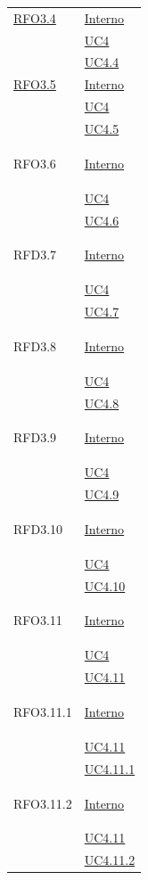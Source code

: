 \begin{longtable}{|>{\centering}m{5cm}|m{5cm}<{\centering}|}
\hyperlink{RFO3.4}{RFO3.4} & \hyperlink{Interno}{Interno}\\
& \hyperref[UC4]{UC4}\\
& \hyperref[UC4.4]{UC4.4}\\ \hline

\hyperlink{RFO3.5}{RFO3.5} & \hyperlink{Interno}{Interno}\\
& \hyperref[UC4]{UC4}\\
& \hyperref[UC4.5]{UC4.5}\\ \hline

\hypertarget{RFO3.6}{RFO3.6} & \hyperlink{Interno}{Interno}\\
&\hyperref[UC4]{UC4}\\
&\hyperref[UC4.6]{UC4.6}\\ \hline

\hypertarget{RFD3.7}{RFD3.7} & \hyperlink{Interno}{Interno}\\
& \hyperref[UC4]{UC4}\\
& \hyperref[UC4.7]{UC4.7}\\ \hline

\hypertarget{RFD3.8}{RFD3.8} & \hyperlink{Interno}{Interno}\\
& \hyperref[UC4]{UC4}\\
& \hyperref[UC4.8]{UC4.8}\\ \hline

\hypertarget{RFD3.9}{RFD3.9} & \hyperlink{Interno}{Interno}\\
& \hyperref[UC4]{UC4}\\
& \hyperref[UC4.9]{UC4.9}\\ \hline

\hypertarget{RFD3.10}{RFD3.10} & \hyperlink{Interno}{Interno}\\
& \hyperref[UC4]{UC4}\\
& \hyperref[UC4.10]{UC4.10}\\ \hline

\hypertarget{RFO3.11}{RFO3.11} & \hyperlink{Interno}{Interno}\\
& \hyperref[UC4]{UC4}\\
& \hyperref[UC4.11]{UC4.11}\\ \hline

\hypertarget{RFO3.11.1}{RFO3.11.1} & \hyperlink{Interno}{Interno}\\
& \hyperref[UC4.11]{UC4.11}\\
& \hyperref[UC4.11.1]{UC4.11.1}\\ \hline

\hypertarget{RFO3.11.2}{RFO3.11.2} & \hyperlink{Interno}{Interno}\\
& \hyperref[UC4.11]{UC4.11}\\
& \hyperref[UC4.11.2]{UC4.11.2}\\ \hline


\end{longtable}
